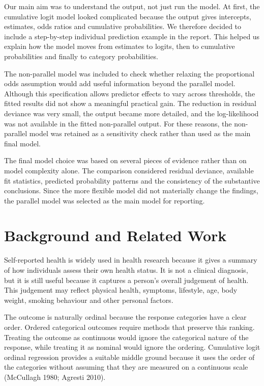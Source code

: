 \documentclass{article}
\begin{document}
Our main aim was to understand the output, not just run the model. At
first, the cumulative logit model looked complicated because the output
gives intercepts, estimates, odds ratios and cumulative probabilities.
We therefore decided to include a step-by-step individual prediction
example in the report. This helped us explain how the model moves from
estimates to logits, then to cumulative probabilities and finally to
category probabilities.

The non-parallel model was included to check whether relaxing the
proportional odds assumption would add useful information beyond the
parallel model. Although this specification allows predictor effects to
vary across thresholds, the fitted results did not show a meaningful
practical gain. The reduction in residual deviance was very small, the
output became more detailed, and the log-likelihood was not available in
the fitted non-parallel output. For these reasons, the non-parallel
model was retained as a sensitivity check rather than used as the main
final model.

The final model choice was based on several pieces of evidence rather
than on model complexity alone. The comparison considered residual
deviance, available fit statistics, predicted probability patterns and
the consistency of the substantive conclusions. Since the more flexible
model did not materially change the findings, the parallel model was
selected as the main model for reporting.

\section{Background and Related Work}\label{background-and-related-work}

Self-reported health is widely used in health research because it gives
a summary of how individuals assess their own health status. It is not a
clinical diagnosis, but it is still useful because it captures a
person's overall judgement of health. This judgement may reflect
physical health, symptoms, lifestyle, age, body weight, smoking
behaviour and other personal factors.

The outcome is naturally ordinal because the response categories have a
clear order. Ordered categorical outcomes require methods that preserve
this ranking. Treating the outcome as continuous would ignore the
categorical nature of the response, while treating it as nominal would
ignore the ordering. Cumulative logit ordinal regression provides a
suitable middle ground because it uses the order of the categories
without assuming that they are measured on a continuous scale (McCullagh
1980; Agresti 2010).
\end{document}
